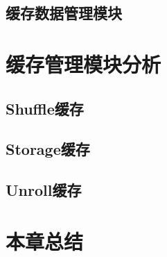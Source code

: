 \subsection{缓存数据管理模块}
\section{缓存管理模块分析}
\subsection{Shuffle缓存}
\subsection{Storage缓存}
\subsection{Unroll缓存}
\section{本章总结}




